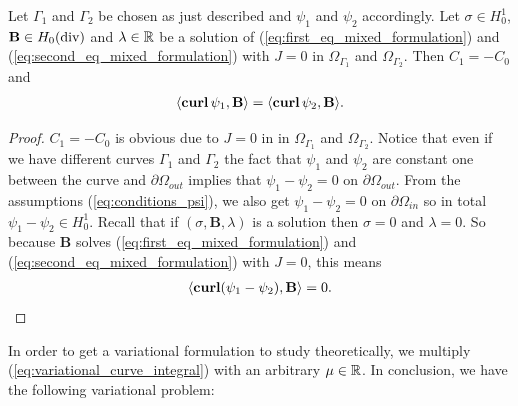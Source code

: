 \documentclass[../master_thesis.tex]{subfiles}
\begin{document}
\begin{proposition}\label{prop:different_curve_same_curve_integral_substitute}
    Let $\Gamma_1$ and $\Gamma_2$ be chosen as just described and $\psi_1$ 
    and $\psi_2$ accordingly. Let $\sigma \in H^1_0$, $\mathbf{B} \in H_0(\operatorname{div})$ 
    and $\lambda \in \mathbb{R}$ be a solution of 
    (\ref{eq:first_eq_mixed_formulation}) and (\ref{eq:second_eq_mixed_formulation})
    with $J=0$ in $\Omega_{\Gamma_1}$ and $\Omega_{\Gamma_2}$.
    Then $C_1 = -C_0$ and
    \begin{align*}
        \langle \veccurl \psi_1, \mathbf{B} \rangle = \langle \veccurl \psi_2, \mathbf{B} \rangle.
    \end{align*}
\end{proposition}
\begin{proof}
    $C_1 = -C_0$ is obvious due to $J=0$ in in $\Omega_{\Gamma_1}$ and $\Omega_{\Gamma_2}$. 
    Notice that even if we have different curves 
    $\Gamma_1$ and $\Gamma_2$ the fact that $\psi_1$ and $\psi_2$ are constant one 
    between the curve and $\partial \Omega_{out}$ implies that 
    $\psi_1 - \psi_2 = 0$ on $\partial\Omega_{out}$. From the assumptions (\ref{eq:conditions_psi}), 
    we also get 
    $\psi_1 - \psi_2 = 0$ on $\partial\Omega_{in}$ so in total 
    $\psi_1 - \psi_2 \in H^1_0$. Recall that if $(\sigma,\mathbf{B},\lambda)$ is a solution
    then $\sigma = 0$ and $\lambda=0$. So because $\mathbf{B}$ solves (\ref{eq:first_eq_mixed_formulation}) and 
    (\ref{eq:second_eq_mixed_formulation}) with $J=0$, this means
    \begin{align*}
        \langle \veccurl (\psi_1 - \psi_2), \mathbf{B} \rangle = 0.
    \end{align*}
\end{proof}

In order to get a variational 
formulation to study theoretically,
 we multiply (\ref{eq:variational_curve_integral}) with an arbitrary $\mu \in \mathbb{R}$. 
In conclusion, we have the following variational problem:
\end{document}
